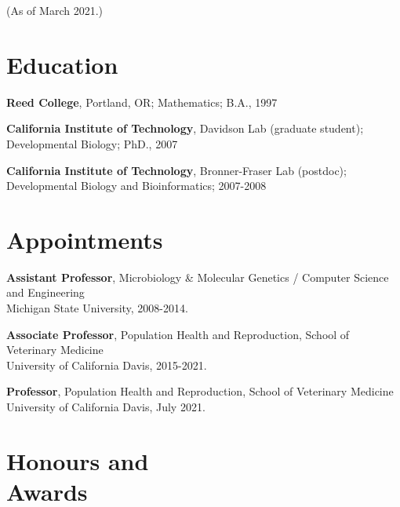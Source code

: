 \documentclass[margin,line]{resume}
\begin{document}
\pagestyle{plain}


\begin{resume}



    {\small (As of March 2021.)}

    \section{\mysidestyle Education}

    {\bf Reed College}, Portland, OR; Mathematics; B.A., 1997

    \vspace{2mm}

    {\bf California Institute of Technology}, Davidson Lab (graduate student);
\\
Developmental Biology; PhD., 2007

    \vspace{2mm}

    {\bf California Institute of Technology}, Bronner-Fraser Lab (postdoc);\\
 Developmental Biology and Bioinformatics; 2007-2008

    \vspace{2mm}

    \section{\mysidestyle Appointments}

    {\bf Assistant Professor}, 
Microbiology \& Molecular Genetics / Computer Science and Engineering\\
Michigan State University, 2008-2014.

    {\bf Associate Professor}, 
Population Health and Reproduction, School of Veterinary Medicine \\
University of California Davis, 2015-2021.

    {\bf Professor}, 
Population Health and Reproduction, School of Veterinary Medicine \\
University of California Davis, July 2021.

    \section{\mysidestyle Honours and\\Awards} 


\end{resume}
\end{document}
